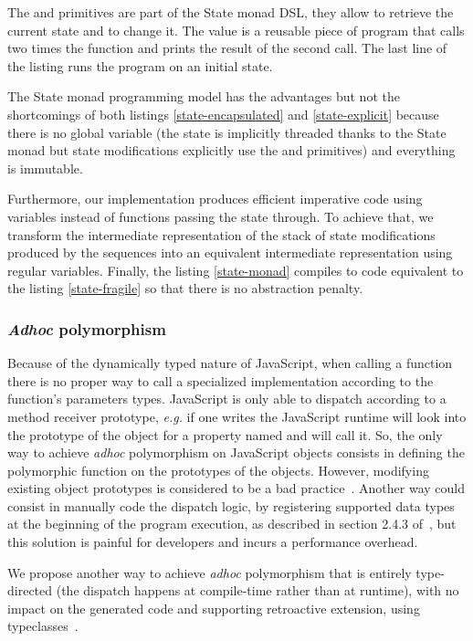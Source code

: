 \documentclass[american,english,runningheads]{llncs}
\newcommand{\eg}{\emph{e.g.}}
\begin{document}
The  and  primitives are part of the State monad DSL, they allow to retrieve the current state
and to change it. The  value is a reusable piece of program that calls two times the  function
and prints the result of the second call. The last line of the listing runs the  program on an initial
state.

The State monad programming model has the advantages but not the shortcomings of both listings
\ref{state-encapsulated} and \ref{state-explicit} because there is no global variable (the state is implicitly
threaded thanks to the State monad but state modifications explicitly use the  and  primitives)
and everything is immutable.

Furthermore, our implementation produces efficient imperative code using variables instead of functions passing the
state through. To achieve that, we transform the intermediate representation of the stack of state modifications
produced by the  sequences into an equivalent intermediate representation using regular variables. Finally,
the listing \ref{state-monad} compiles to code equivalent to the listing \ref{state-fragile} so that there is no
abstraction penalty.

\subsubsection{\emph{Adhoc} polymorphism}

Because of the dynamically typed nature of JavaScript, when calling a function there is no proper way to call a
specialized implementation according to the function’s parameters types. JavaScript is only able to dispatch
according to a method receiver prototype, \eg{} if one writes  the JavaScript runtime will look into
the prototype of the  object for a property named  and will call it. So, the only way to achieve
\emph{adhoc} polymorphism on JavaScript objects consists in defining the polymorphic function on the prototypes of
the objects. However, modifying existing object prototypes is considered to be a bad
practice~\cite{Zakas12_MaintainableJs}. Another way could consist in manually code the dispatch logic, by registering
supported data types at the beginning of the program execution, as described in section 2.4.3
of~\cite{Abelson83_SICP}, but this solution is painful for developers and incurs a performance overhead.

We propose another way to achieve \emph{adhoc} polymorphism that is entirely type-directed (the dispatch happens at
compile-time rather than at runtime), with no impact on the generated code and supporting retroactive extension,
using typeclasses~\cite{Wadler89_AdhocPolymorphism,Odersky06_Typeclasses,Oliveira10_Typeclasses}.
\end{document}
